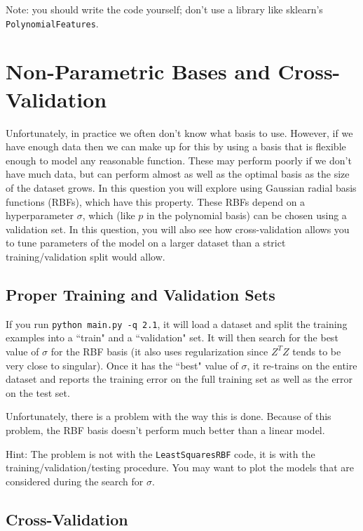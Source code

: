 \documentclass{article}
\begin{document}
Note: you should write the code yourself; don't use a library like sklearn's \texttt{PolynomialFeatures}.


\section{Non-Parametric Bases and Cross-Validation}

Unfortunately, in practice we often don't know what basis to use.
However, if we have enough data then we can make up for this by using a basis that is flexible enough to
model any reasonable function. These may perform poorly if we don't have much data, but can
 perform almost as well as the optimal basis as the size of the dataset grows.
 In this question you will explore using Gaussian radial basis functions (RBFs),
 which have this property. These RBFs depend on a hyperparameter $\sigma$, which
 (like $p$ in the polynomial basis) can be chosen using a validation set.
 In this question, you will also see how cross-validation allows you to tune
 parameters of the model on a larger dataset than a strict training/validation split would allow.

\subsection{Proper Training and Validation Sets}

If you run \verb|python main.py -q 2.1|, it will load a dataset and split the training examples
 into a ``train" and a ``validation" set. It will then search for the best value of $\sigma$
 for the RBF basis (it also uses regularization since $Z^TZ$ tends to be very close to singular).
  Once it has the ``best" value of $\sigma$, it re-trains on the entire dataset and reports the
  training error on the full training set as well as the error on the test set.

Unfortunately, there is a problem with the way this is done. Because of this problem,
the RBF basis doesn't perform much better than a linear model.

Hint: The problem is not with the \texttt{LeastSquaresRBF} code, it is with the
training/validation/testing procedure.
You may want to plot the models that are considered during the search for $\sigma$.



\subsection{Cross-Validation}
\end{document}
